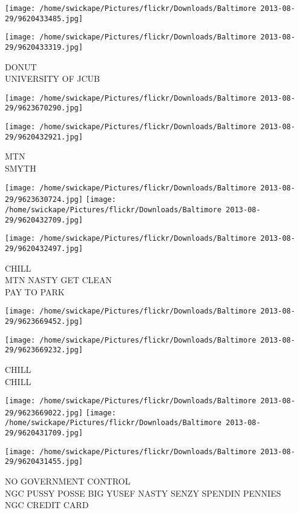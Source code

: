 \documentclass[10pt,letterpaper]{article}
\begin{document}
\texttt{[image: /home/swickape/Pictures/flickr/Downloads/Baltimore 2013-08-29/9620433485.jpg]}

\vspace{0.25in}
\texttt{[image: /home/swickape/Pictures/flickr/Downloads/Baltimore 2013-08-29/9620433319.jpg]}

DONUT\\
UNIVERSITY OF JCUB
\pagebreak

\texttt{[image: /home/swickape/Pictures/flickr/Downloads/Baltimore 2013-08-29/9623670290.jpg]}

\vspace{0.25in}
\texttt{[image: /home/swickape/Pictures/flickr/Downloads/Baltimore 2013-08-29/9620432921.jpg]}

MTN\\
SMYTH
\pagebreak

\texttt{[image: /home/swickape/Pictures/flickr/Downloads/Baltimore 2013-08-29/9623630724.jpg]}
\texttt{[image: /home/swickape/Pictures/flickr/Downloads/Baltimore 2013-08-29/9620432709.jpg]}

\texttt{[image: /home/swickape/Pictures/flickr/Downloads/Baltimore 2013-08-29/9620432497.jpg]}

CHILL\\
MTN NASTY GET CLEAN\\
PAY TO PARK
\pagebreak

\texttt{[image: /home/swickape/Pictures/flickr/Downloads/Baltimore 2013-08-29/9623669452.jpg]}

\vspace{0.25in}
\texttt{[image: /home/swickape/Pictures/flickr/Downloads/Baltimore 2013-08-29/9623669232.jpg]}

CHILL\\
CHILL
\pagebreak

\texttt{[image: /home/swickape/Pictures/flickr/Downloads/Baltimore 2013-08-29/9623669022.jpg]}
\texttt{[image: /home/swickape/Pictures/flickr/Downloads/Baltimore 2013-08-29/9620431709.jpg]}

\texttt{[image: /home/swickape/Pictures/flickr/Downloads/Baltimore 2013-08-29/9620431455.jpg]}

NO GOVERNMENT CONTROL\\
NGC PUSSY POSSE BIG YUSEF NASTY SENZY SPENDIN PENNIES\\
NGC CREDIT CARD
\pagebreak
\end{document}
